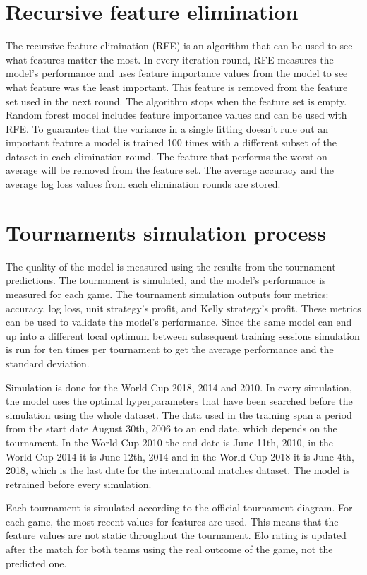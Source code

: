 \section{Recursive feature elimination}
The recursive feature elimination (RFE) is an algorithm that can be used to see what features matter the most. In every iteration round, RFE measures the model's performance and uses feature importance values from the model to see what feature was the least important. This feature is removed from the feature set used in the next round. The algorithm stops when the feature set is empty. \cite{granitto2006recursive} Random forest model includes feature importance values and can be used with RFE. To guarantee that the variance in a single fitting doesn't rule out an important feature a model is trained 100 times with a different subset of the dataset in each elimination round. The feature that performs the worst on average will be removed from the feature set. The average accuracy and the average log loss values from each elimination rounds are stored.

\section{Tournaments simulation process}
The quality of the model is measured using the results from the tournament predictions. The tournament is simulated, and the model's performance is measured for each game. The tournament simulation outputs four metrics: accuracy, log loss, unit strategy's profit, and Kelly strategy's profit. These metrics can be used to validate the model's performance. Since the same model can end up into a different local optimum between subsequent training sessions simulation is run for ten times per tournament to get the average performance and the standard deviation.

Simulation is done for the World Cup 2018, 2014 and 2010. In every simulation, the model uses the optimal hyperparameters that have been searched before the simulation using the whole dataset. The data used in the training span a period from the start date August 30th, 2006 to an end date, which depends on the tournament. In the World Cup 2010 the end date is June 11th, 2010, in the World Cup 2014 it is June 12th, 2014 and in the World Cup 2018 it is June 4th, 2018, which is the last date for the international matches dataset. The model is retrained before every simulation.

Each tournament is simulated according to the official tournament diagram. For each game, the most recent values for features are used. This means that the feature values are not static throughout the tournament. Elo rating is updated after the match for both teams using the real outcome of the game, not the predicted one.

